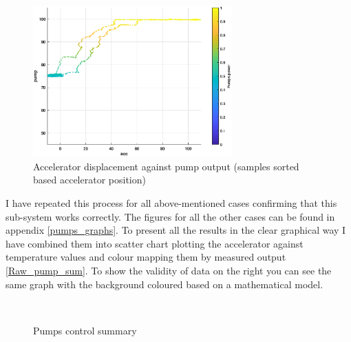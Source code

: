 \begin{figure}[h]
    \centering
    \includegraphics[height=5.8cm]{figures/pump_50_1.eps}
    \caption[Accelerator displacement against pump output]{Accelerator displacement against pump output (samples sorted based accelerator position)}
    \label{pump_50_1}
\end{figure}

I have repeated this process for all above-mentioned cases confirming that this sub-system works correctly. The figures for all the other cases can be found in appendix \ref{pumps_graphs}. To present all the results in the clear graphical way I have combined them into scatter chart plotting the accelerator against temperature values and colour mapping them by measured output \ref{Raw_pump_sum}. To show the validity of data on the right you can see the same graph with the background coloured based on a mathematical model.

\begin{figure}[h]
    \centering
        ~
        \caption{Pumps control summary}
    \label{Pump_sum}
\end{figure}

